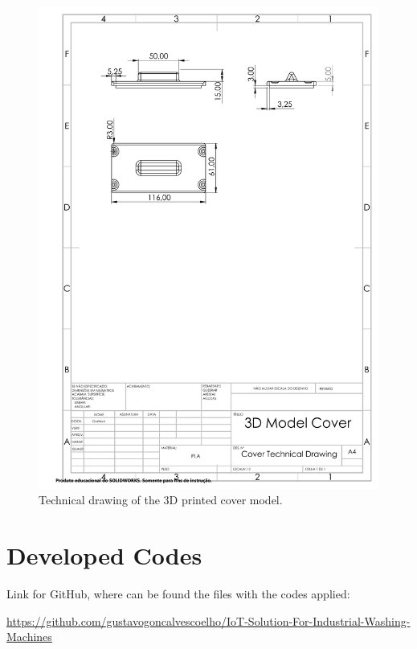 \begin{figure}[h!]
    \centering
    \includegraphics[scale=0.65]{images/Results/3D_Model_Cover_Technical_Drawing.PDF}
    \caption{Technical drawing of the 3D printed cover model.}
    \label{fig:3dModelCover}
\end{figure}

\clearpage
\section{Developed Codes}\label{appendice:code}

\begin{center}
    Link for GitHub, where can be found the files with the codes applied:
\end{center}

\begin{center}
\url{https://github.com/gustavogoncalvescoelho/IoT-Solution-For-Industrial-Washing-Machines}
\end{center}
